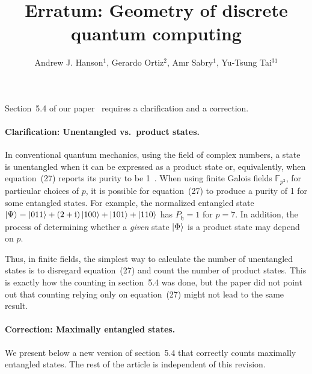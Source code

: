 \documentclass[12pt]{iopart}
\newcommand{\ff}[1]{\mathbb{F}_{#1}}
\def\fh{\mathfrak{h}}
\begin{document}
\title{Erratum: Geometry of discrete quantum computing}

\author{Andrew J. Hanson$^{1}$, Gerardo Ortiz$^{2}$, Amr Sabry$^{1}$,
Yu-Tsung Tai$^{31}$}


\address{$^{1}$ School of Informatics and Computing, Indiana University,
Bloomington, IN 47405, U.S.A}


\address{$^{2}$ Department of Physics, Indiana University, Bloomington, IN
47405, U.S.A}


\address{$^{3}$ Department of Mathematics, Indiana University, Bloomington,
IN 47405, U.S.A}



\submitto{\jpa}

\maketitle

\noindent Section~5.4 of our paper~\cite{geometry} requires a clarification and a correction.

\paragraph*{Clarification: Unentangled vs.\ product states.}
In conventional quantum mechanics, using the field of complex numbers, a state is unentangled when it can be expressed as a product state or, equivalently, when equation~(27) reports its purity to be 1~\cite{PhysRevLett.92.107902, PhysRevA.68.032308}. When using finite Galois fields $\ff{p^2}$, for particular choices of $p$, it is possible for equation~(27) to produce a purity of 1 for some entangled states. For example, the normalized entangled state $\ket{\Psi} = \ket{011}+\left(2+\mathrm{i}\right)\ket{100}+\ket{101}+\ket{110}$ has $P_{\fh}=1$ for $p=7$. In addition, the process of determining whether a \emph{given} state $\ket{\Phi}$ is a product state may depend on $p$. 

Thus, in finite fields, the simplest way to calculate the number of
unentangled states is to disregard equation~(27) and count the number
of product states. This is exactly how the counting in section~5.4
was done, but the paper did not point out that counting relying only on equation~(27) might not lead to the same result.

\paragraph*{Correction: Maximally entangled states.}
We present below a new version of section~5.4 that correctly counts maximally entangled states. The rest of the article is independent of this revision.
\end{document}
